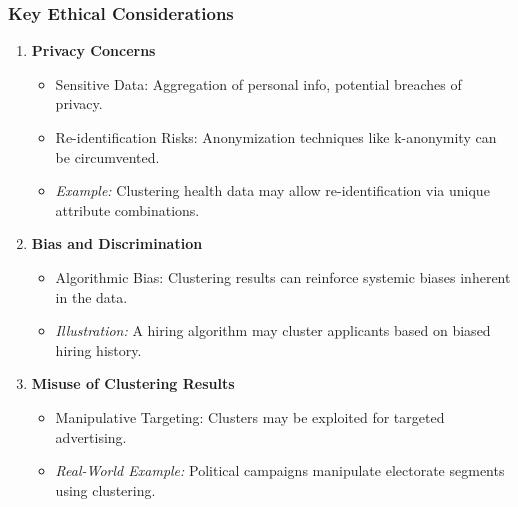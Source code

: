\documentclass[aspectratio=169]{beamer}
\begin{document}
\begin{frame}[fragile]
    \frametitle{Key Ethical Considerations}
    \begin{enumerate}
        \item \textbf{Privacy Concerns}
            \begin{itemize}
                \item Sensitive Data: Aggregation of personal info, potential breaches of privacy.
                \item Re-identification Risks: Anonymization techniques like k-anonymity can be circumvented.
                \item \textit{Example:} Clustering health data may allow re-identification via unique attribute combinations.
            \end{itemize}
        \item \textbf{Bias and Discrimination}
            \begin{itemize}
                \item Algorithmic Bias: Clustering results can reinforce systemic biases inherent in the data.
                \item \textit{Illustration:} A hiring algorithm may cluster applicants based on biased hiring history.
            \end{itemize}
        \item \textbf{Misuse of Clustering Results}
            \begin{itemize}
                \item Manipulative Targeting: Clusters may be exploited for targeted advertising.
                \item \textit{Real-World Example:} Political campaigns manipulate electorate segments using clustering.
            \end{itemize}
    \end{enumerate}
\end{frame}
\end{document}
